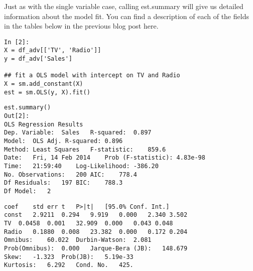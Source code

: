 \begin{frame}[fragile]
	\Large
Just as with the single variable case, calling est.summary will give us detailed information about the model fit. You can find a description of each of the fields in the tables below in the previous blog post here.
\end{frame}

\begin{frame}[fragile]
	\Large
\begin{framed}
	\begin{verbatim}
In [2]:
X = df_adv[['TV', 'Radio']]
y = df_adv['Sales']

## fit a OLS model with intercept on TV and Radio
X = sm.add_constant(X)
est = sm.OLS(y, X).fit()
\end{verbatim}
\end{framed}
\end{frame}

\begin{frame}[fragile]
	\Large
	\begin{framed}
		\begin{verbatim}
est.summary()
Out[2]:
OLS Regression Results
Dep. Variable:	Sales	R-squared:	0.897
Model:	OLS	Adj. R-squared:	0.896
Method:	Least Squares	F-statistic:	859.6
Date:	Fri, 14 Feb 2014	Prob (F-statistic):	4.83e-98
Time:	21:59:40	Log-Likelihood:	-386.20
No. Observations:	200	AIC:	778.4
Df Residuals:	197	BIC:	788.3
Df Model:	2		
\end{verbatim}
\end{framed}
\end{frame}

\begin{frame}[fragile]
\Large
\begin{framed}
\begin{verbatim}
coef	std err	t	P>|t|	[95.0% Conf. Int.]
const	2.9211	0.294	9.919	0.000	2.340 3.502
TV	0.0458	0.001	32.909	0.000	0.043 0.048
Radio	0.1880	0.008	23.382	0.000	0.172 0.204
Omnibus:	60.022	Durbin-Watson:	2.081
Prob(Omnibus):	0.000	Jarque-Bera (JB):	148.679
Skew:	-1.323	Prob(JB):	5.19e-33
Kurtosis:	6.292	Cond. No.	425.
\end{verbatim}
\end{framed}
\end{frame}

